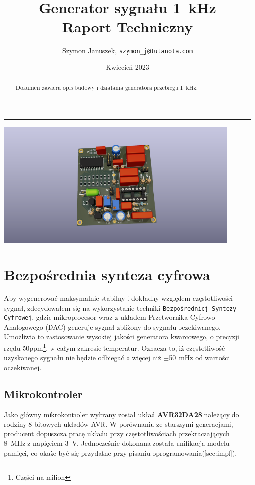 \documentclass[12pt, a4paper]{article}
\title{
	Generator sygnału \qty{1}{\kHz}\\
	\large Raport Techniczny
}
\author{Szymon Januszek, \texttt{szymon\_j@tutanota.com}}
\date{Kwiecień 2023}
\begin{document}
\normalfont
{}
\maketitle
\hrule

\begin{abstract}
	Dokumen zawiera opis budowy i działania generatora przebiegu \qty{1}{\kHz}.
\end{abstract}

\begin{center}
	\includegraphics[width=0.9\textwidth]{board_render_1.png}
\end{center}


\newpage

\tableofcontents

\newpage

\section{Bezpośrednia synteza cyfrowa}

Aby wygenerować maksymalnie stabilny i dokładny względem częstotliwości sygnał, 
zdecydowałem się na wykorzystanie techniki \verb|Bezpośredniej Syntezy Cyfrowej|, 
gdzie mikroprocesor wraz z układem Przetwornika Cyfrowo-Analogowego (DAC) generuje sygnał zbliżony do sygnału oczekiwanego. 
Umożliwia to zastosowanie wysokiej jakości generatora kwarcowego, o precyzji rzędu 50ppm\footnote{Części na milion}, 
w całym zakresie temperatur. Oznacza to, iż częstotliwość uzyskanego sygnału nie będzie odbiegać o więcej niż $\pm$\qty{50}{\mHz} od wartości oczekiwanej. 

\subsection{Mikrokontroler}
Jako główny mikrokontroler wybrany został układ \textbf{AVR32DA28}\cite{avr-datasheet} należący do rodziny 8-bitowych układów AVR.
W porównaniu ze starszymi generacjami, producent dopuszcza pracę układu przy częstotliwościach przekraczających \qty{8}{\MHz} z napięciem \qty{3}{\volt}.
Jednocześnie dokonana została unifikacja modelu pamięci, co okaże być się przydatne przy pisaniu oprogramowania(\ref{sec:impl}).
\end{document}
